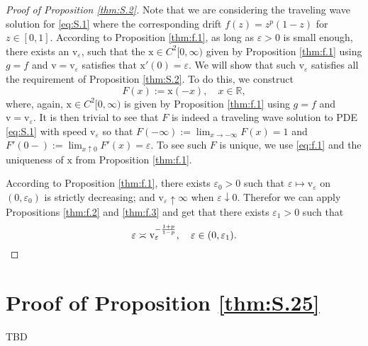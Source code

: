 \documentclass[12pt,a4paper]{amsart}
\numberwithin{equation}{section}
\theoremstyle{plain}
\theoremstyle{remark}
\begin{document}
\begin{proof}[Proof of Proposition \ref{thm:S.2}]
	Note that we are considering the traveling wave solution for \eqref{eq:S.1} where the corresponding drift $f(z) = z^p(1-z)$ for $z\in [0,1]$.
	According to Proposition \ref{thm:f.1}, as long as $\varepsilon>0$ is small enough, there exists an $\mathrm v_\varepsilon$, such that the $\mathrm x\in C^2[0,\infty)$ given by Proposition \ref{thm:f.1} using $g = f$ and $\mathrm v=\mathrm v_\varepsilon$ satisfies that $\mathrm x'(0) = \varepsilon$.
	We will show that such $\mathrm v_\varepsilon$ satisfies all the requirement of Proposition \ref{thm:S.2}. 
	To do this, we construct 
\begin{equation} \label{eq:f.1}
	F(x) := \mathrm x(-x), \quad x\in \mathbb R,
\end{equation}
	where, again, $\mathrm x\in C^2[0,\infty)$ is given by Proposition \ref{thm:f.1} using $g = f$ and $\mathrm v=\mathrm v_\varepsilon$.
	It is then trivial to see that $F$ is indeed a traveling wave solution to PDE \eqref{eq:S.1} with speed $\mathrm v_\varepsilon$ so that $F(-\infty):= \lim_{x\to -\infty} F(x) = 1$ and $F'(0-):= \lim_{x\uparrow 0}F'(x) = \varepsilon$.
	To see such $F$ is unique, we use \eqref{eq:f.1} and the uniqueness of $\mathrm x$ from Proposition \ref{thm:f.1}.
	
	According to Proposition \ref{thm:f.1}, there exists $\varepsilon_0>0$ such that $\varepsilon \mapsto \mathrm v_\varepsilon$ on $(0, \varepsilon_0)$ is strictly decreasing; and $\mathrm v_\varepsilon\uparrow \infty$ when $\varepsilon \downarrow 0$. 
	Therefor we can apply Propositions \ref{thm:f.2} and \ref{thm:f.3} and get that there exists $\varepsilon_1>0$ such that
\[
	\varepsilon \asymp \mathrm v_\varepsilon^{-\frac{1+p}{1-p}}, \quad \varepsilon \in (0, \varepsilon_1). 
	\qedhere
\]  
\end{proof}
\section{Proof of Proposition \ref{thm:S.25}}
{\color{blue} TBD}
\end{document}
